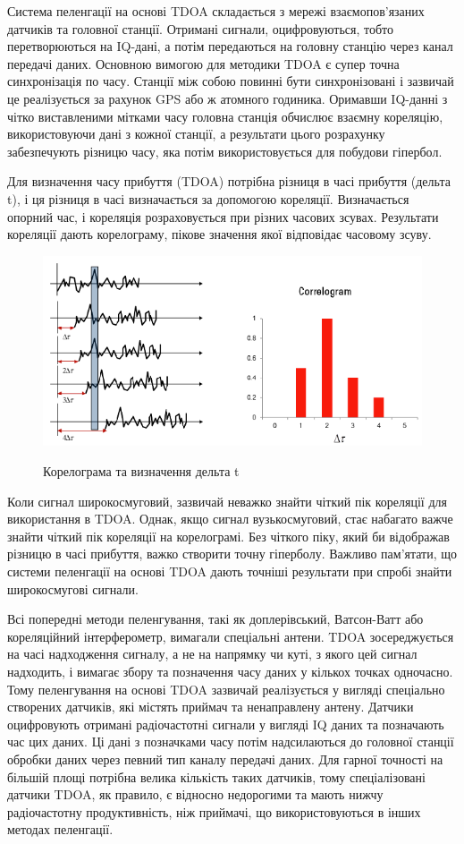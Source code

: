 \documentclass{article}
\begin{document}
Система пеленгації на основі TDOA складається з мережі взаємопов'язаних датчиків та головної станції. Отримані сигнали, оцифровуються, тобто перетворюються на IQ-дані, а потім передаються на головну станцію через канал передачі даних. Основною вимогою для методики TDOA є супер точна синхронізація по часу. Станції між собою повинні бути синхронізовані і зазвичай це реалізується за рахунок GPS або ж атомного годиника. Оримавши IQ-данні з чітко виставленими мітками часу головна станція обчислює взаємну кореляцію, використовуючи дані з кожної станції, а результати цього розрахунку забезпечують різницю часу, яка потім використовується для побудови гіпербол.

Для визначення часу прибуття (TDOA) потрібна різниця в часі прибуття (дельта t), і ця різниця в часі визначається за допомогою кореляції. Визначається опорний час, і кореляція розраховується при різних часових зсувах. Результати кореляції дають корелограму, пікове значення якої відповідає часовому зсуву.


\begin{figure}[H]
	\centering
	{\includegraphics[width=0.6\linewidth]{images/tdoa_corelelogram.png}}
	\caption{Корелограма та визначення дельта t}
\end{figure}

Коли сигнал широкосмуговий, зазвичай неважко знайти чіткий пік кореляції для використання в TDOA. Однак, якщо сигнал вузькосмуговий, стає набагато важче знайти чіткий пік кореляції на корелограмі. Без чіткого піку, який би відображав різницю в часі прибуття, важко створити точну гіперболу. Важливо пам'ятати, що системи пеленгації на основі TDOA дають точніші результати при спробі знайти широкосмугові сигнали.

Всі попередні методи пеленгування, такі як доплерівський, Ватсон-Ватт або кореляційний інтерферометр, вимагали спеціальні антени. TDOA зосереджується на часі надходження сигналу, а не на напрямку чи куті, з якого цей сигнал надходить, і вимагає збору та позначення часу даних у кількох точках одночасно. Тому пеленгування на основі TDOA зазвичай реалізується у вигляді спеціально створених датчиків, які містять приймач та ненаправлену антену. Датчики оцифровують отримані радіочастотні сигнали у вигляді IQ даних та позначають час цих даних. Ці дані з позначками часу потім надсилаються до головної станції обробки даних через певний тип каналу передачі даних. Для гарної точності на більшій площі потрібна велика кількість таких датчиків, тому спеціалізовані датчики TDOA, як правило, є відносно недорогими та мають нижчу радіочастотну продуктивність, ніж приймачі, що використовуються в інших методах пеленгації.
\end{document}
